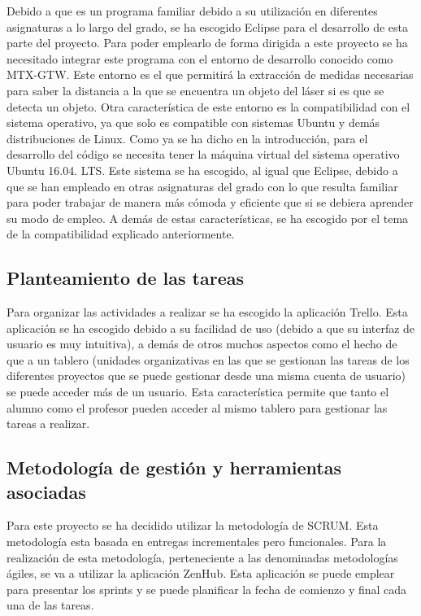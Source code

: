 Debido a que es un programa familiar debido a su utilización en diferentes asignaturas a lo largo del grado, se ha escogido Eclipse para el desarrollo de esta parte del proyecto. Para poder emplearlo de forma dirigida a este proyecto se ha necesitado integrar este programa con el entorno de desarrollo conocido como MTX-GTW. \hfill
\break\break
Este entorno es el que permitirá la extracción de medidas necesarias para saber la distancia a la que se encuentra un objeto del láser si es que se detecta un objeto. Otra característica de este entorno es la compatibilidad con el sistema operativo, ya que solo es compatible con sistemas Ubuntu y demás distribuciones de Linux. \hfill
\break\break
Como ya se ha dicho en la introducción,  para el desarrollo del código se necesita tener la máquina virtual del sistema operativo Ubuntu 16.04. LTS. Este sistema se ha escogido, al igual que Eclipse, debido a que se han empleado en otras asignaturas del grado con lo que resulta familiar para poder trabajar de manera más cómoda y eficiente que si se debiera aprender su modo de empleo. A demás de estas características, se ha escogido por el tema de la compatibilidad explicado anteriormente.\hfill

\subsection{Planteamiento de las tareas}

Para organizar las actividades a realizar se ha escogido la aplicación Trello. Esta aplicación se ha escogido debido a su facilidad de uso (debido a que su interfaz de usuario es muy intuitiva), a demás de otros muchos aspectos como el hecho de que a un tablero (unidades organizativas en las que se gestionan las tareas de los diferentes proyectos que se puede gestionar desde una misma cuenta de usuario) se puede acceder más de un usuario. Esta característica permite que tanto el alumno como el profesor pueden acceder al mismo tablero para gestionar las tareas a realizar.

\subsection{Metodología de gestión y herramientas asociadas}

Para este proyecto se ha decidido utilizar la metodología de SCRUM. Esta metodología esta basada en entregas incrementales pero funcionales. Para la realización de esta metodología, perteneciente a las denominadas metodologías ágiles, se va a utilizar la aplicación ZenHub. Esta aplicación se puede emplear para presentar los sprints y se puede planificar la fecha de comienzo y final cada una de las tareas.

